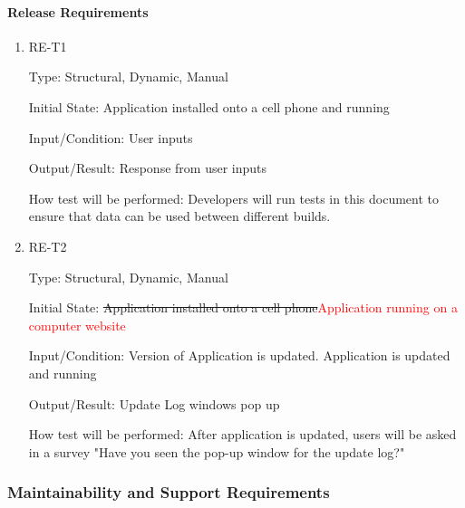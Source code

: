 \documentclass[12pt, titlepage]{article}
\begin{document}
\paragraph{Release Requirements}

\begin{enumerate}

\item{RE-T1\\}

Type: Structural, Dynamic, Manual
					
Initial State: Application installed onto a cell phone and running
					
Input/Condition: User inputs
					
Output/Result: Response from user inputs
					
How test will be performed: Developers will run tests in this document to ensure that data can be used between different builds.
					
\item{RE-T2\\}

Type: Structural, Dynamic, Manual
					
Initial State: \sout{Application installed onto a cell phone}\textcolor{red}{Application running on a computer website}
					
Input/Condition: Version of Application is updated. Application is updated and running
					
Output/Result: Update Log windows pop up
					
How test will be performed: After application is updated, users will be asked in a survey "Have you seen the pop-up window for the update log?" 

\end{enumerate}

\subsubsection{Maintainability and Support Requirements}
\end{document}

